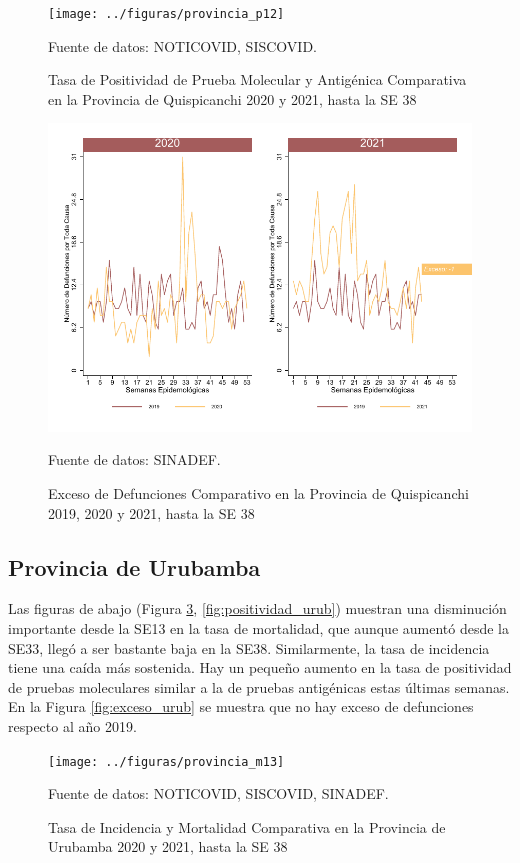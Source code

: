 \documentclass[12pt,a4paper,openany]{book}
\begin{document}
	\begin{figure}[h]
	\caption{Tasa de Positividad de Prueba Molecular y Antigénica Comparativa en la Provincia de Quispicanchi 2020 y 2021, hasta la SE 38}\label{fig:positividad_quisp}
	\begin{center}
		\texttt{[image: ../figuras/provincia\_p12]}
	\end{center}
	{\footnotesize {Fuente de datos: NOTICOVID, SISCOVID.}}
	\end{figure}

	\begin{figure}[h]
	\caption{Exceso de Defunciones Comparativo en la Provincia de Quispicanchi 2019, 2020 y 2021, hasta la SE 38}\label{fig:exceso_quisp}
	\begin{center}
		\includegraphics[width=0.7\linewidth]{../figuras/exceso_12}
	\end{center}
	{\footnotesize {Fuente de datos: SINADEF.}}
	\end{figure}

\clearpage

	\subsection*{Provincia de Urubamba}
	\noindent Las figuras de abajo (Figura \ref{fig:inc_urub}, \ref{fig:positividad_urub})  muestran una disminución importante desde la SE13 en la tasa de mortalidad, que aunque aumentó desde la SE33, llegó a ser bastante baja en la SE38. Similarmente, la tasa de incidencia tiene una caída más sostenida. Hay un pequeño aumento en la tasa de positividad de pruebas moleculares similar a la de pruebas antigénicas estas últimas semanas. En la Figura \ref{fig:exceso_urub} se muestra que no hay exceso de defunciones respecto al año 2019.

	\begin{figure}[h]
	\caption{Tasa de Incidencia y Mortalidad Comparativa en la Provincia de Urubamba 2020 y 2021, hasta la SE 38}\label{fig:inc_urub}
	\begin{center}
		\texttt{[image: ../figuras/provincia\_m13]}
	\end{center}
	{\footnotesize {Fuente de datos: NOTICOVID, SISCOVID, SINADEF.}}
	\end{figure}
\end{document}
